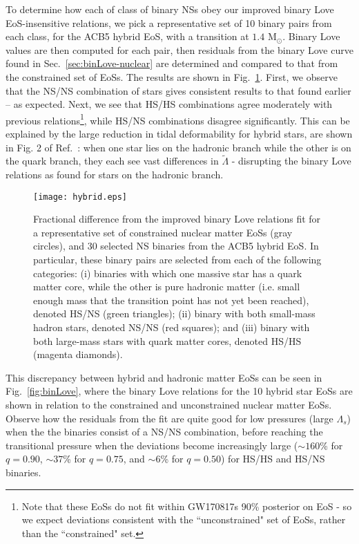 \documentclass[prd,twocolumn,nofootinbib,superscriptaddress,amsmath,amssymb]{revtex4-1}
\begin{document}
To determine how each of class of binary NSs obey our improved binary Love EoS-insensitive relations, we pick a representative set of 10 binary pairs from each class, for the ACB5 hybrid EoS, with a transition at $1.4 \text{ M}_{\odot}$.
Binary Love values are then computed for each pair, then residuals from the binary Love curve found in Sec.~\ref{sec:binLove-nuclear} are determined and compared to that from the constrained set of EoSs.
The results are shown in Fig.~\ref{fig:hybrid}.
First, we observe that the NS/NS combination of stars gives consistent results to that found earlier -- as expected.
Next, we see that HS/HS combinations agree moderately with previous relations\footnote{Note that these EoSs do not fit within GW170817s 90\% posterior on EoS - so we expect deviations consistent with the ``unconstrained" set of EoSs, rather than the ``constrained" set.}, while HS/NS combinations disagree significantly.
This can be explained by the large reduction in tidal deformability for hybrid stars, are shown in Fig. 2 of Ref.~\cite{Paschalidis2018}: when one star lies on the hadronic branch while the other is on the quark branch, they each see vast differences in $\tilde{\Lambda}$ - disrupting the binary Love relations as found for stars on the hadronic branch.

\begin{figure}
\begin{center} 
\texttt{[image: hybrid.eps]}
\end{center}
\caption{
Fractional difference from the improved binary Love relations fit for a representative set of constrained nuclear matter EoSs (gray circles), and 30 selected NS binaries from the ACB5 hybrid EoS.
In particular, these binary pairs are selected from each of the following categories: (i) binaries with which one massive star has a quark matter core, while the other is pure hadronic matter (i.e. small enough mass that the transition point has not yet been reached), denoted HS/NS (green triangles); (ii) binary with both small-mass hadron stars, denoted NS/NS (red squares); and (iii) binary with both large-mass stars with quark matter cores, denoted HS/HS (magenta diamonds).
}
\label{fig:hybrid}
\end{figure} 

This discrepancy between hybrid and hadronic matter EoSs can be seen in Fig.~\ref{fig:binLove}, where the binary Love relations for the 10 hybrid star EoSs are shown in relation to the constrained and unconstrained nuclear matter EoSs.
Observe how the residuals from the fit are quite good for low pressures (large $\Lambda_s$) when the the binaries consist of a NS/NS combination, before reaching the transitional pressure when the deviations become increasingly large ($\sim160$\% for $q=0.90$, $\sim37$\% for $q=0.75$, and $\sim6$\% for $q=0.50$) for HS/HS and HS/NS binaries.
\end{document}

